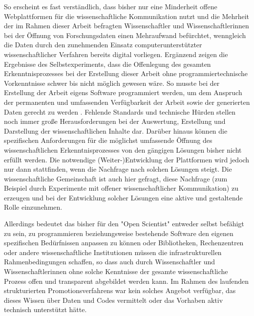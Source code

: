 So erscheint es fast verständlich, dass bisher nur eine Minderheit offene Webplattformen für die wissenschaftliche Kommunikation \cite{Perkel_2014} nutzt und die Mehrheit der im Rahmen dieser Arbeit befragten Wissenschaftler und Wissenschaftlerinnen bei der Öffnung von Forschungsdaten einen Mehraufwand befürchtet, wenngleich die Daten durch den zunehmenden Einsatz computerunterstützter wissenschaftlicher Verfahren bereits digital vorliegen. Ergänzend zeigen die Ergebnisse des Selbstexperiments, dass die Offenlegung des gesamten Erkenntnisprozesses bei der Erstellung dieser Arbeit ohne programmiertechnische Vorkenntnisse schwer bis nicht möglich gewesen wäre. So musste bei der Erstellung der Arbeit eigens Software programmiert werden, um dem Anspruch der permanenten und umfassenden Verfügbarkeit der Arbeit sowie der generierten Daten gerecht zu werden \cite{Heise_2015c}. Fehlende Standards und technische Hürden stellen noch immer große Herausforderungen bei der Auswertung, Erstellung und Darstellung der wissenschaftlichen Inhalte dar. Darüber hinaus können die spezifischen Anforderungen für die möglichst umfassende Öffnung des wissenschaftlichen Erkenntnisprozesses von den gängigen Lösungen bisher nicht erfüllt werden. Die notwendige (Weiter-)Entwicklung der Plattformen wird jedoch nur dann stattfinden, wenn die Nachfrage nach solchen Lösungen steigt. Die wissenschaftliche Gemeinschaft ist auch hier gefragt, diese Nachfrage (zum Beispiel durch Experimente mit offener wissenschaftlicher Kommunikation) zu erzeugen und bei der Entwicklung solcher Lösungen eine aktive und gestaltende Rolle einzunehmen.

Allerdings bedeutet das bisher für den "Open Scientist" entweder selbst befähigt zu sein, zu programmieren beziehungsweise bestehende Software den eigenen spezifischen Bedürfnissen anpassen zu können oder Bibliotheken, Rechenzentren oder andere wissenschaftliche Institutionen müssen die infrastrukturellen Rahmenbedingungen schaffen, so dass auch durch Wissenschaftler und Wissenschaftlerinnen ohne solche Kenntnisse der gesamte wissenschaftliche Prozess offen und transparent abgebildet werden kann. Im Rahmen des laufenden strukturierten Promotionsverfahrens war kein solches Angebot verfügbar, das dieses Wissen über Daten und Codes vermittelt oder das Vorhaben aktiv technisch unterstützt hätte.

